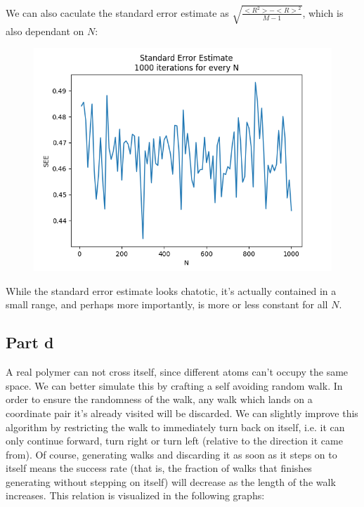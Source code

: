 \documentclass[a4paper,12pt]{article}
\begin{document}
We can also caculate the standard error estimate as $\sqrt{\frac{<\!R^2\!> - {<\!R\!>}^2}{M - 1}}$, which is also
dependant on $N$:

\begin{figure}[!ht]
  \centering
  \includegraphics[scale=0.48]{img/2_1c_stderrest_1000.png}
\end{figure}

While the standard error estimate looks chatotic, it's actually contained in a small range, and perhaps more
importantly, is more or less constant for all $N$.

\subsection*{Part d}

A real polymer can not cross itself, since different atoms can't occupy the same space. We can better simulate this
by crafting a self avoiding random walk. In order to ensure the randomness of the walk, any walk which lands on a
coordinate pair it's already visited will be discarded. We can slightly improve this algorithm by restricting the
walk to immediately turn back on itself, i.e. it can only continue forward, turn right or turn left (relative to the
direction it came from). Of course, generating walks and discarding it as soon as it steps on to itself means the
success rate (that is, the fraction of walks that finishes generating without stepping on itself) will decrease as
the length of the walk increases. This relation is visualized in the following graphs:
\end{document}
